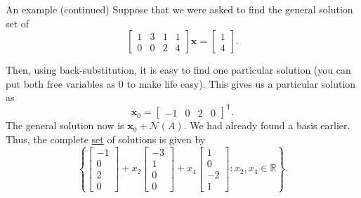 \documentclass[dvipsnames]{beamer}
\newcommand{\TT}{\mathsf{T}}
\theoremstyle{definition}
\begin{document}
\begin{frame}{An example (continued)}
    Suppose that we were asked to find the general solution set of
    \begin{equation*} 
        \begin{bmatrix}
            \boxed{1} & 3 & 1 & 1 \\
            0 & 0 & \boxed{2} & 4
        \end{bmatrix} \mathbf{x} 
        =
        \begin{bmatrix}
            1 \\
            4
        \end{bmatrix}.
    \end{equation*} \pause

    Then, using back-substitution, it is easy to find one particular solution \pause (you can put both free variables as $0$ to make life easy). \pause This gives us a particular solution as
    \begin{equation*} 
        \mathbf{x}_{0} = 
        \begin{bmatrix}
            -1 &
            0 &
            2 &
            0
        \end{bmatrix}^{\TT}.
    \end{equation*} \pause
    The general solution now is $\mathbf{x}_{0} + \mathcal{N}(A)$. \pause We had already found a basis earlier. \pause Thus, the complete \underline{set} of solutions is given by
    \begin{equation*} 
        \left\{\begin{bmatrix}
            -1 \\
            0 \\
            2 \\
            0
        \end{bmatrix} +
        x_{2} \begin{bmatrix}
        -3 \\
        1 \\
        0 \\
        0
        \end{bmatrix} + 
        x_{4} \begin{bmatrix}
            1 \\ 
            0 \\ 
            -2 \\ 
            1
        \end{bmatrix} : x_{2}, x_{4} \in \mathbb{R}
        \right\}.
    \end{equation*} 
\end{frame}
\end{document}
